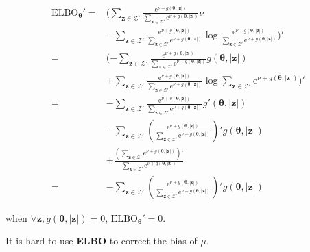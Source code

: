 \documentclass[notitlepage]{article}
\begin{document}
\begin{align}
    \mathrm{ELBO}_{\bm{\theta}}' =& (\sum_{\bm{z}\in\mathcal{Z}'}\frac{\mathrm{e}^{\nu+g(\bm{\theta},|\bm{z}|)}}{\sum_{\bm{z}\in\mathcal{Z}'}\mathrm{e}^{\nu+g(\bm{\theta},|\bm{z}|)}}\nu \\
    &- \sum_{\bm{z}\in\mathcal{Z}'}\frac{\mathrm{e}^{\nu+g(\bm{\theta},|\bm{z}|)}}{\sum_{\bm{z}\in\mathcal{Z}'}\mathrm{e}^{\nu+g(\bm{\theta},|\bm{z}|)}}\log\frac{\mathrm{e}^{\nu+g(\bm{\theta},|\bm{z}|)}}{\sum_{\bm{z}\in\mathcal{Z}'}\mathrm{e}^{\nu+g(\bm{\theta},|\bm{z}|)}})' \\
    =& (-\sum_{\bm{z}\in\mathcal{Z}'}\frac{\mathrm{e}^{\nu+g(\bm{\theta},|\bm{z}|)}}{\sum_{\bm{z}\in\mathcal{Z}'}\mathrm{e}^{\nu+g(\bm{\theta},|\bm{z}|)}}g(\bm{\theta},|\bm{z}|) \\
    &+ \sum_{\bm{z}\in\mathcal{Z}'}\frac{\mathrm{e}^{\nu+g(\bm{\theta},|\bm{z}|)}}{\sum_{\bm{z}\in\mathcal{Z}'}\mathrm{e}^{\nu+g(\bm{\theta},|\bm{z}|)}}\log\sum_{\bm{z}\in\mathcal{Z}'}\mathrm{e}^{\nu+g(\bm{\theta},|\bm{z}|)})' \\
    =& -\sum_{\bm{z}\in\mathcal{Z}'}\frac{\mathrm{e}^{\nu+g(\bm{\theta},|\bm{z}|)}}{\sum_{\bm{z}\in\mathcal{Z}'}\mathrm{e}^{\nu+g(\bm{\theta},|\bm{z}|)}}g'(\bm{\theta},|\bm{z}|) \\
    &- \sum_{\bm{z}\in\mathcal{Z}'}(\frac{\mathrm{e}^{\nu+g(\bm{\theta},|\bm{z}|)}}{\sum_{\bm{z}\in\mathcal{Z}'}\mathrm{e}^{\nu+g(\bm{\theta},|\bm{z}|)}})'g(\bm{\theta},|\bm{z}|) \\
    &+ \frac{(\sum_{\bm{z}\in\mathcal{Z}'}\mathrm{e}^{\nu+g(\bm{\theta},|\bm{z}|)})'}{\sum_{\bm{z}\in\mathcal{Z}'}\mathrm{e}^{\nu+g(\bm{\theta},|\bm{z}|)}} \\
    =& -\sum_{\bm{z}\in\mathcal{Z}'}(\frac{\mathrm{e}^{\nu+g(\bm{\theta},|\bm{z}|)}}{\sum_{\bm{z}\in\mathcal{Z}'}\mathrm{e}^{\nu+g(\bm{\theta},|\bm{z}|)}})'g(\bm{\theta},|\bm{z}|)
\end{align}

when $\forall \bm{z}, g(\bm{\theta},|\bm{z}|)=0$, $\mathrm{ELBO}_{\bm{\theta}}'=0$. 

It is hard to use \textbf{ELBO} to correct the bias of $\mu$. 

\end{document}
